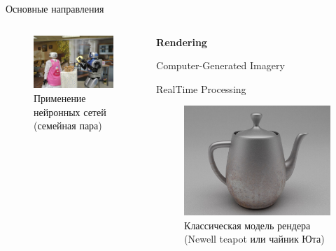 \documentclass{beamer}
\begin{document}
\begin{frame}{Основные направления}
\begin{columns}
\begin{column}{0.3\textwidth}
				\begin{figure}
				\includegraphics[width=\textwidth]{images/Computer_vision.png}
				\caption{Применение нейронных сетей (семейная пара)}
				\end{figure}
			\end{column}
			
			\begin{column}{0.4\textwidth}
				
				\textbf{Rendering}
				
				Computer-Generated Imagery
				
				RealTime Processing
				\begin{figure}
				\includegraphics[width=\textwidth]{images/Utah_teapot.png}
				\caption{Классическая модель рендера (Newell teapot или чайник Юта)}
				\end{figure}
				

\end{column}
\end{columns}
\end{frame}
\end{document}
